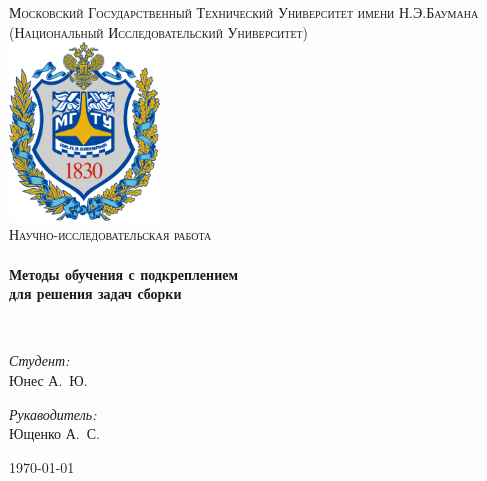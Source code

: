 \begin{titlepage}
\begin{center}

\textsc{\Large Московский Государственный Технический Университет имени Н.Э.Баумана}\\
\textsc{\large (Национальный Исследовательский Университет)}\\[1.5cm]

\includegraphics[width=0.3\textwidth]{img/logo.png}~\\[1cm]

\textsc{\Large Научно-исследовательская работа}\\[0.5cm]

\HRule \\[0.4cm]
{ \LARGE \bfseries Методы обучения с подкреплением \\ для решения задач сборки \\[0.4cm] }

\HRule \\[1.5cm]

\noindent
\begin{minipage}{0.4\textwidth}
\begin{flushleft} \large
\emph{Студент:}\\
Юнес \textsc{А.~Ю.}
\end{flushleft}
\end{minipage}%
\begin{minipage}{0.4\textwidth}
\begin{flushright} \large
\emph{Рукаводитель:} \\
Ющенко \textsc{А.~С.}
\end{flushright}
\end{minipage}

\vfill

{\large \today}

\end{center}
\end{titlepage}